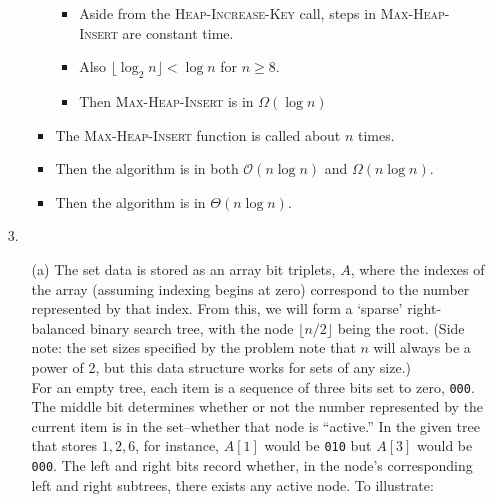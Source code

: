 \documentclass{article}
\begin{document}
\begin{enumerate}
\begin{enumerate}
\begin{itemize}
\begin{itemize}
            \item Aside from the \textsc{Heap-Increase-Key} call, steps in \textsc{Max-Heap-Insert} are constant time.
            \item Also $\lfloor \log_2 n \rfloor < \log n$ for $n \geq 8$.
            \item Then \textsc{Max-Heap-Insert} is in $\Omega(\log n)$
            \end{itemize}
        \item The \textsc{Max-Heap-Insert} function is called about $n$ times.
        \item Then the algorithm is in both $\mathcal{O}(n \log n)$ and $\Omega(n \log n)$.
        \item Then the algorithm is in $\Theta(n \log n)$.
        \end{itemize}
    \end{enumerate}
\item [3.]
    \begin{enumerate}
        \item [(a)] The set data is stored as an array bit triplets, $A$, where the indexes of the array (assuming indexing begins at zero) correspond to the number represented by that index. From this, we will form a `sparse' right-balanced binary search tree, with the node $\lfloor n / 2 \rfloor$ being the root. (Side note: the set sizes specified by the problem note that $n$ will always be a power of 2, but this data structure works for sets of any size.) \\

        For an empty tree, each item is a sequence of three bits set to zero, \texttt{000}. The middle bit determines whether or not the number represented by the current item is in the set--whether that node is ``active.'' In the given tree that stores ${1, 2, 6}$, for instance, $A[1]$ would be \texttt{010} but $A[3]$ would be \texttt{000}. The left and right bits record whether, in the node's corresponding left and right subtrees, there exists any active node. To illustrate:


\end{enumerate}
\end{enumerate}
\end{document}
